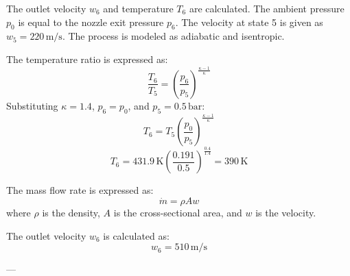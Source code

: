 The outlet velocity \( w_6 \) and temperature \( T_6 \) are calculated. The ambient pressure \( p_0 \) is equal to the nozzle exit pressure \( p_6 \). The velocity at state 5 is given as \( w_5 = 220 \, \text{m/s} \). The process is modeled as adiabatic and isentropic.  

The temperature ratio is expressed as:  
\[
\frac{T_6}{T_5} = \left( \frac{p_6}{p_5} \right)^{\frac{\kappa - 1}{\kappa}}
\]  
Substituting \( \kappa = 1.4 \), \( p_6 = p_0 \), and \( p_5 = 0.5 \, \text{bar} \):  
\[
T_6 = T_5 \left( \frac{p_0}{p_5} \right)^{\frac{\kappa - 1}{\kappa}}
\]  
\[
T_6 = 431.9 \, \text{K} \left( \frac{0.191}{0.5} \right)^{\frac{0.4}{1.4}} = 390 \, \text{K}
\]  

The mass flow rate is expressed as:  
\[
\dot{m} = \rho A w
\]  
where \( \rho \) is the density, \( A \) is the cross-sectional area, and \( w \) is the velocity.  

The outlet velocity \( w_6 \) is calculated as:  
\[
w_6 = 510 \, \text{m/s}
\]  

---